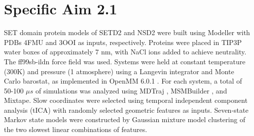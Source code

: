 \documentclass[12pt]{article}
\begin{document}
\section{Specific Aim 2.1}

SET domain protein models of SETD2 and NSD2 were built using Modeller with PDBs 4FMU and 3OOI as inputs, respectively.  Proteins were placed in TIP3P water boxes of approximately 7 nm, with NaCl ions added to achieve neutrality.  The ff99sb-ildn force field \cite{lindorff2010improved} was used.  Systems were held at constant temperature (300K) and pressure (1 atmosphere) using a Langevin integrator and Monte Carlo barostat, as implemented in OpenMM 6.0.1 \cite{openmm2012}.  For each system, a total of 50-100 $\mu s$ of simulations was analyzed using MDTraj \cite{mdtraj2014}, MSMBuilder \cite{beauchamp2011msmbuilder2}, and Mixtape.  Slow coordinates were selected using temporal independent component analysis (tICA) \cite{schwantes2013improvements, perez2013identification} with randomly selected geometric features as inputs.  Seven-state Markov state models were constructed by Gaussian mixture model clustering of the two slowest linear combinations of features.
\end{document}
